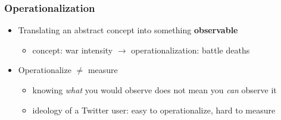 \begin{frame}
\frametitle{Operationalization}
\centering

\begin{itemize}
  \item Translating an abstract concept into something \textbf{observable}
  \begin{itemize}
    \item concept: war intensity $\rightarrow$ operationalization: battle deaths
  \end{itemize}
  \vspace{8pt}
  \item<2-> Operationalize $\neq$ measure
  \begin{itemize}
    \item<2-> knowing \textit{what} you would observe does not mean you \textit{can} observe it
    \item<2-> ideology of a Twitter user: easy to operationalize, hard to measure
  \end{itemize}
\end{itemize}

\end{frame}

